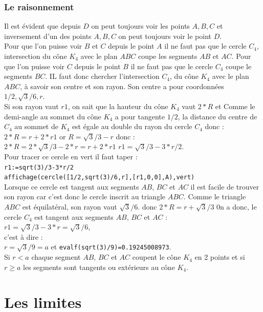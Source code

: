 \documentclass[a4paper,11pt]{book}
\begin{document}
\subsection{Le raisonnement}
Il est \'evident que depuis $D$ on peut toujours voir les points $A,B,C$ et 
inversement d'un des points $A,B,C$ on peut toujours voir le point $D$.\\
Pour que l'on puisse voir $B$ et $C$ depuis le point $A$ il ne faut pas que le
cercle $C_4$, intersection du c\^one $K_4$ avec le plan $ABC$ coupe les 
segments $AB$ et $AC$. Pour que l'on puisse voir $C$ depuis le point $B$ il ne 
faut pas que le cercle $C_4$ coupe le segments $BC$.
IL faut donc chercher l'intersection $C_4$, du c\^one $K_4$ avec le plan $ABC$,
\`a savoir son centre et son rayon. Son centre a pour coordonn\'ees
$1/2,\sqrt 3/6,r$. \\
Si son rayon vaut $r1$, on sait que la hauteur du c\^one $K_4$ vaut $2*R$ et 
Comme le demi-angle au sommet  du c\^one $K_4$
a pour tangente $1/2$, la distance du centre de $C_4$ au sommet de $K_4$ est
\'egale au double du rayon du cercle $C_4$ donc :\\
$2*R=r+2*r1$ or $R=\sqrt 3/3-r$ donc :\\
 $2*R=2*\sqrt 3/3-2*r=r+2*r1$
$r1=\sqrt 3/3-3*r/2$.\\
Pour tracer ce cercle en vert il faut taper :\\
{\tt r1:=sqrt(3)/3-3*r/2}\\
{\tt affichage(cercle([1/2,sqrt(3)/6,r],[r1,0,0],A),vert)}\\

Lorsque ce cercle est tangent aux segments $AB$,
$BC$ et $AC$ il est facile de trouver son rayon car c'est donc le cercle 
inscrit au triangle $ABC$. Comme le 
triangle $ABC$ est \'equilat\'eral, son rayon vaut $\sqrt 3/6$. 
 donc  $2*R=r+\sqrt 3/3$ 
0n a donc, le cercle $C_4$ est tangent aux segments $AB$, $BC$ et $AC$ :\\
$r1=\sqrt 3/3-3*r=\sqrt 3/6$, \\
c'est \`a dire :\\
$r=\sqrt 3/9=a$ et {\tt evalf(sqrt(3)/9)=0.19245008973}.\\
Si $r<a$ chaque segment $AB$, $BC$ et $AC$ coupent le c\^one $K_4$ en 2 points
et si $r \geq a$ les segments sont tangents ou ext\'erieurs au c\^one $K_4$. 




\chapter{Les limites}
\end{document}

